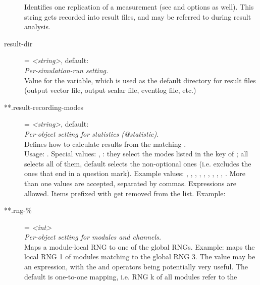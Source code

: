 \begin{description}
    Identifies one replication of a measurement (see  and
     options as well). This string gets
    recorded into result files, and may be referred to during result analysis.
\item[result-dir] = \textit{<string>}, default: \\
    \textit{Per-simulation-run setting.}\\
    Value for the  variable,
    which is used as the default directory for result files (output vector
    file, output scalar file, eventlog file, etc.)
\item[**.result-recording-modes] = \textit{<string>}, default: \\
    \textit{Per-object setting for statistics (@statistic).}\\
    Defines how to calculate results from the matching
    .\\Usage:
    .
    Special values: , : they select the modes listed in
    the  key of ; all selects all of
    them, default selects the non-optional ones (i.e. excludes the ones that
    end in a question mark). Example values: , ,
    , , , , , ,
    , . More than one values are accepted, separated
    by commas. Expressions are allowed. Items prefixed with
    \ttt{-{\allowbreak}} get removed from the list. Example:
\item[**.rng-\%] = \textit{<int>}\\
    \textit{Per-object setting for modules and channels.}\\
    Maps a module-local RNG to one of the global RNGs. Example:
    maps the local RNG 1 of modules matching  to the
    global RNG 3. The value may be an expression, with the  and
     operators being potentially very useful. The
    default is one-to-one mapping, i.e. RNG k of all modules refer to the

\end{description}
